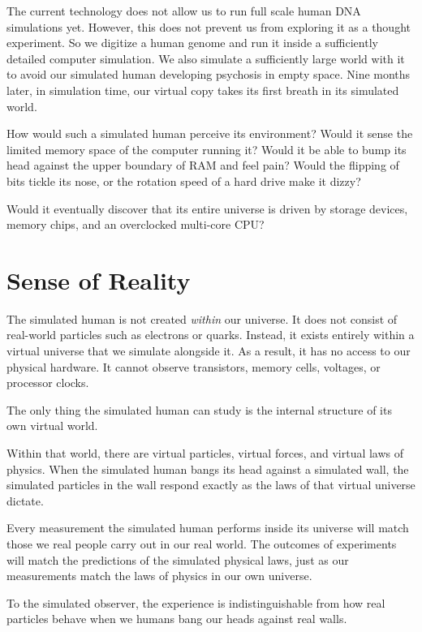 The current technology does not allow us to run full scale human DNA simulations yet. However, this does not prevent us from exploring it as a thought experiment.
So we digitize a human genome and run it inside a sufficiently 
detailed computer simulation. We also simulate a sufficiently large world with it to avoid our simulated human
developing psychosis in empty space.  Nine months later, in simulation time, our virtual copy takes its first breath 
in its simulated world.

How would such a simulated human perceive its environment? Would it sense the limited memory space of the 
computer running it? Would it be able to bump its head against the upper boundary of RAM and feel pain? 
Would the flipping of bits tickle its nose, or the rotation speed of a hard drive make it dizzy?

Would it eventually discover that its entire universe is driven by storage devices, memory chips, and an 
overclocked multi-core CPU?

\section*{Sense of Reality}

The simulated human is not created \emph{within} our universe. It does not consist of real-world particles such 
as electrons or quarks. Instead, it exists entirely within a virtual universe that we simulate alongside it. 
As a result, it has no access to our physical hardware. It cannot observe transistors, memory cells, voltages, 
or processor clocks.

The only thing the simulated human can study is the internal structure of its own virtual world.

Within that world, there are virtual particles, virtual forces, and virtual laws of physics. When the 
simulated human bangs its head against a simulated wall, the simulated particles in the wall respond exactly 
as the laws of that virtual universe dictate.

Every measurement the simulated human performs inside its universe will match those we real people
carry out in our real world.
The outcomes of experiments will match the predictions of the simulated physical laws, just as our 
measurements match the laws of physics in our own universe.

To the simulated observer, the experience is indistinguishable 
from how real particles behave when we humans bang our heads against real walls.

